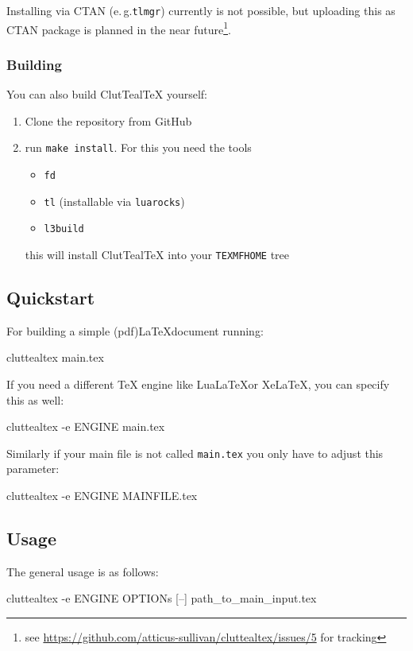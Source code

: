 \documentclass[a4paper, 11pt]{scrartcl}
\newcommand\eg{e.\,g.\xspace}
\let\TeXold\TeX
\newcommand\CluttealTeX{ClutTeal\TeX\xspace}
\renewcommand\TeX{\TeXold\xspace}
\begin{document}
Installing via CTAN (\eg \texttt{tlmgr}) currently is not possible, but uploading this as CTAN package is planned in the near future\footnote{see \url{https://github.com/atticus-sullivan/cluttealtex/issues/5} for tracking}.

\subsubsection{Building}
You can also build \CluttealTeX yourself:
\begin{enumerate}
	\renewcommand{\theenumi}{\arabic{enumi}}
	\item Clone the repository from GitHub
	\item run \texttt{make install}. For this you need the tools
		\begin{itemize}
			\item \texttt{fd}
			\item \texttt{tl} (installable via \texttt{luarocks})
			\item \texttt{l3build}
		\end{itemize}
		this will install \CluttealTeX into your \texttt{TEXMFHOME} tree
\end{enumerate}

\subsection{Quickstart}
For building a simple (pdf)\LaTeX document running:
\begin{boxcode}[none][\normalsize]
cluttealtex main.tex
\end{boxcode}

If you need a different \TeX engine like Lua\LaTeX or Xe\LaTeX, you can specify this as well:
\begin{boxcode}[none][\normalsize]
cluttealtex -e ENGINE main.tex
\end{boxcode}

Similarly if your main file is not called \texttt{main.tex} you only have to adjust this parameter:
\begin{boxcode}[none][\normalsize]
cluttealtex -e ENGINE MAINFILE.tex
\end{boxcode}

\subsection{Usage}
The general usage is as follows:
\begin{boxcode}[none][\normalsize]
cluttealtex -e ENGINE OPTIONs [--] path_to_main_input.tex
\end{boxcode}
\end{document}
